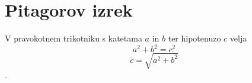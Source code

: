 \documentclass{article}
\begin{document}
\section*{Pitagorov izrek}
V pravokotnem trikotniku s katetama \(a\) in \(b\) ter hipotenuzo \(c\) velja
\[ a^2 + b^2 = c^2 \]
\[c=\sqrt{a^2+b^2}\].
\end{document}
